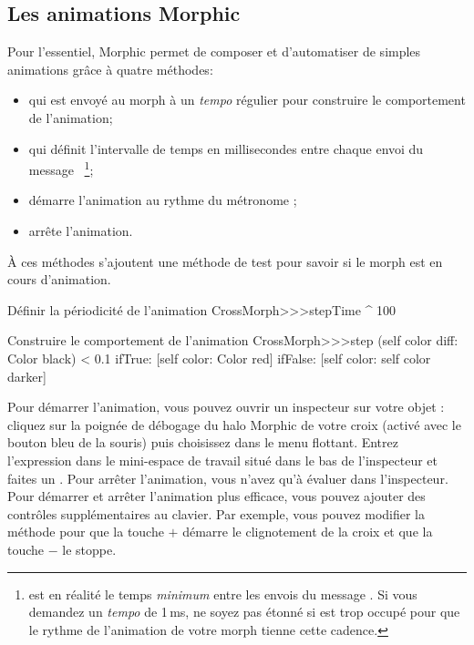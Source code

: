 \documentclass[a4paper,10pt,twoside]{book}
\begin{document}

\subsection{Les animations Morphic}

Pour l'essentiel, Morphic permet de composer et d'automatiser de
simples animations gr\^ace \`a quatre m\'ethodes:
\begin{itemize}
\item {} qui est envoy\'e au morph \`a un
  \emph{tempo} r\'egulier pour construire le comportement de l'animation;
\item {} qui d\'efinit l'intervalle de temps en
  millisecondes entre chaque envoi du message ~\footnote{ est
    en r\'ealit\'e le temps \emph{minimum} entre les envois du message
    . Si vous demandez un \emph{tempo}  de
    1\,ms, ne soyez pas \'etonn\'e si \sq est trop occup\'e pour que
    le rythme de l'animation de votre morph tienne cette cadence.};
\item {} d\'emarre l'animation au rythme
  du m\'etronome ;
\item {} arr\^ete l'animation.
\end{itemize}

\`A ces m\'ethodes s'ajoutent une m\'ethode de test
 pour savoir si le morph est en cours
d'animation.%

\begin{method}{D\'efinir la p\'eriodicit\'e de l'animation}
CrossMorph>>>stepTime
	^ 100
\end{method}
\begin{method}{Construire le comportement de l'animation}
CrossMorph>>>step
	(self color diff: Color black) < 0.1
		ifTrue: [self color: Color red]
		ifFalse: [self color: self color darker]
\end{method}
\noindent
Pour d\'emarrer l'animation, vous pouvez ouvrir un inspecteur sur
votre objet : cliquez sur la poign\'ee de d\'ebogage 
\debugHandle{} du halo Morphic de votre croix (activ\'e avec le
bouton bleu de la souris) puis choisissez  dans le
menu flottant. Entrez l'expression  dans le
mini-espace de travail situ\'e dans le bas de l'inspecteur et faites
un .
Pour arr\^eter l'animation, vous n'avez qu'\`a \'evaluer  dans l'inspecteur. 
Pour d\'emarrer et arr\^eter l'animation plus efficace, vous pouvez
ajouter des contr\^oles suppl\'ementaires au clavier. Par exemple,
vous pouvez modifier la m\'ethode  pour que la
touche $+$ d\'emarre le clignotement de la croix et que la touche $-$
le stoppe.
\end{document}
